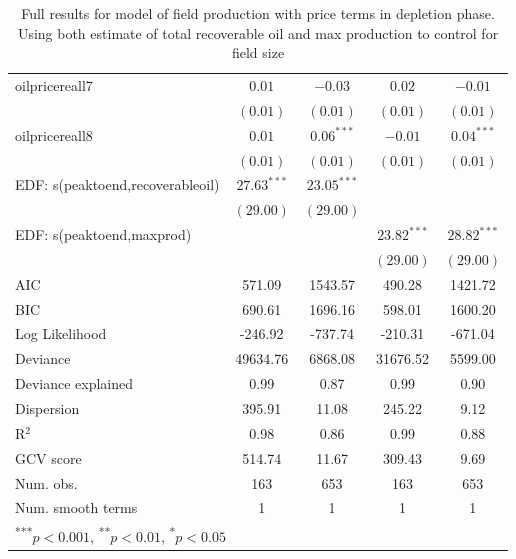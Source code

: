 \documentclass[11pt]{article}
\begin{document}
\begin{spacing}{1}
\begin{table}
\begin{center}
\begin{tabular}{l c c c c }
oilpricereall7                   & $0.01$        & $-0.03$       & $0.02$        & $-0.01$       \\
                                    & $(0.01)$      & $(0.01)$      & $(0.01)$      & $(0.01)$      \\
oilpricereall8                   & $0.01$        & $0.06^{***}$  & $-0.01$       & $0.04^{***}$  \\
                                    & $(0.01)$      & $(0.01)$      & $(0.01)$      & $(0.01)$      \\
EDF: s(peaktoend,recoverableoil) & $27.63^{***}$ & $23.05^{***}$ &               &               \\
                                    & $(29.00)$     & $(29.00)$     &               &               \\
EDF: s(peaktoend,maxprod)        &               &               & $23.82^{***}$ & $28.82^{***}$ \\
                                    &               &               & $(29.00)$     & $(29.00)$     \\
\hline
AIC                                 & 571.09        & 1543.57       & 490.28        & 1421.72       \\
BIC                                 & 690.61        & 1696.16       & 598.01        & 1600.20       \\
Log Likelihood                      & -246.92       & -737.74       & -210.31       & -671.04       \\
Deviance                            & 49634.76      & 6868.08       & 31676.52      & 5599.00       \\
Deviance explained                  & 0.99          & 0.87          & 0.99          & 0.90          \\
Dispersion                          & 395.91        & 11.08         & 245.22        & 9.12          \\
R$^2$                               & 0.98          & 0.86          & 0.99          & 0.88          \\
GCV score                           & 514.74        & 11.67         & 309.43        & 9.69          \\
Num. obs.                           & 163           & 653           & 163           & 653           \\
Num. smooth terms                   & 1             & 1             & 1             & 1             \\
\hline
\multicolumn{5}{l}{\scriptsize{\textsuperscript{***}$p<0.001$, 
  \textsuperscript{**}$p<0.01$, 
  \textsuperscript{*}$p<0.05$}}
\end{tabular}
\caption{Full results for model of field production with price terms in depletion phase.  Using both estimate of total recoverable oil and max production to control for field size}
\label{table:postpeak}
\end{center}
\end{table}



\end{spacing}
\end{document}
